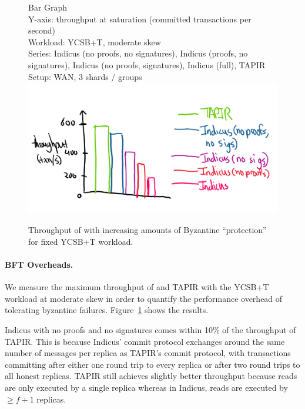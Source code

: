 \begin{figure}
  Bar Graph\\
  Y-axis: throughput at saturation (committed transactions per second)\\
  Workload: YCSB+T, moderate skew\\
  Series: Indicus (no proofs, no signatures), Indicus (proofs, no signatures),
    Indicus (no proofs, signatures), Indicus (full), TAPIR\\
  Setup: WAN, 3 shards / groups\\
  \includegraphics[width=\columnwidth]{figures/eval/bft-overhead-tput.png}
  \caption{Throughput of \sys{} with increasing amounts of Byzantine
  ``protection'' for fixed YCSB+T workload.}
  \label{fig:bft-overhead-tput}
\end{figure}

\paragraph{BFT Overheads.} 
We measure the maximum throughput of \sys{} and TAPIR with the YCSB+T workload at moderate skew in order to quantify the performance overhead of tolerating byzantine failures.
Figure~\ref{fig:bft-overhead-tput} shows the results.

Indicus with no proofs and no signatures comes within 10\% of the throughput of
TAPIR. This is because Indicus' commit protocol exchanges around the same
number of messages per replica as TAPIR's commit protocol, with
transactions committing after either one round trip to every replica or after
two round trips to all honest replicas.  TAPIR still achieves slightly
better throughput because reads are only executed by a single replica whereas in
Indicus, reads are executed by $\geq f+1$ replicas. 

